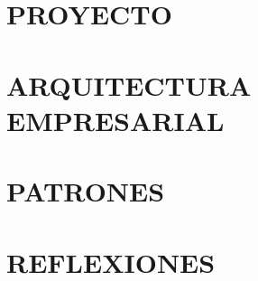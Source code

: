 \documentclass[a4paper,12pt]{report}
\begin{document}
    \maketitle
    \tableofcontents

    \part{PROYECTO}
    
    

    \part{ARQUITECTURA EMPRESARIAL}
    
    
    
    
    
    

    \part{PATRONES}
    
    
    

    \part{REFLEXIONES}
    \printbibliography
\end{document}
